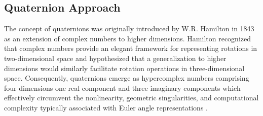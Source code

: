 \subsection*{\textbf{Quaternion Approach}}



The concept of quaternions was originally introduced by W.R. Hamilton in 1843 \cite{hamilton1866elements} as an extension of complex numbers to higher dimensions. Hamilton recognized that complex numbers provide an elegant framework for representing rotations in two-dimensional space and hypothesized that a generalization to higher dimensions would similarly facilitate rotation operations in three-dimensional space. Consequently, quaternions emerge as hypercomplex numbers comprising four dimensions one real component and three imaginary components which effectively circumvent the nonlinearity, geometric singularities, and computational complexity typically associated with Euler angle representations \cite{fresk2013full,fresk2013modeling}.



